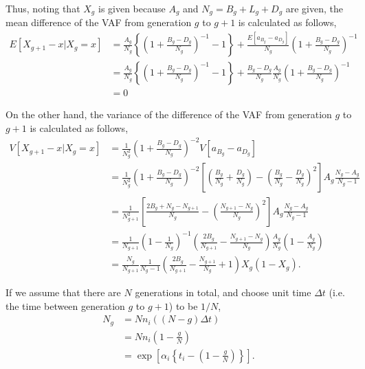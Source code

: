 \documentclass[12pt]{article}
\begin{document}
Thus, noting that $X_g$ is given because $A_g$ and $N_g = B_g + L_g + D_g$ are given, the mean difference of the VAF from generation $g$ to $g+1$ is calculated as follows,
\begin{align}
 E[X_{g+1} - x | X_{g}=x] & = \frac{A_g}{N_g} \left\{ \left(1 + \frac{B_g - D_g}{N_g}\right)^{-1} - 1 \right\} + \frac{ E\left[ a_{B_g} - a_{D_g} \right] }{N_g} \left( 1 + \frac{B_g - D_g}{N_g} \right)^{-1} \nonumber\label{VAF_diff_mean}\\
 & = \frac{A_g}{N_g} \left\{ \left(1 + \frac{B_g - D_g}{N_g}\right)^{-1} - 1 \right\} +  \frac{B_g - D_g}{N_g} \frac{A_g}{N_g} \left( 1 + \frac{B_g - D_g}{N_g} \right)^{-1} \nonumber\\
 & = 0
\end{align}

On the other hand, the variance of the difference of the VAF from generation $g$ to $g+1$ is calculated as follows,
\begin{align}
 V[X_{g+1} - x | X_{g}=x] & = \frac{1}{N_g^2} \left(1 + \frac{B_g - D_g}{N_g}\right)^{-2} V[a_{B_g} - a_{D_g}] \nonumber\\
 & = \frac{1}{N_g^2} \left(1 + \frac{B_g - D_g}{N_g}\right)^{-2} \left[ \left( \frac{B_g}{N_g} + \frac{D_g}{N_g} \right) - \left( \frac{B_g}{N_g} - \frac{D_g}{N_g} \right)^2 \right] A_g \frac{N_g - A_g}{N_g - 1} \nonumber\\
 & = \frac{1}{N_{g+1}^2} \left[ \frac{2B_g + N_g - N_{g+1}}{N_g} - \left( \frac{N_{g+1} - N_g}{N_g} \right)^2 \right] A_g \frac{N_g - A_g}{N_g - 1} \nonumber\\
 & = \frac{1}{N_{g+1}} \left(1 - \frac{1}{N_g}\right)^{-1} \left( \frac{2B_g}{N_{g+1}} - \frac{N_{g+1} - N_g}{N_g} \right) \frac{A_g}{N_g} \left(1 - \frac{A_g}{N_g} \right) \nonumber\\
 & = \frac{N_g}{N_{g+1}} \frac{1}{N_g - 1} \left( \frac{2B_g}{N_{g+1}} - \frac{N_{g+1}}{N_g} + 1 \right) X_g \left(1 - X_g \right).
\end{align}

If we assume that there are $N$ generations in total, and choose unit time $\varDelta t$ (i.e. the time between generation $g$ to $g+1$) to be $1/N$, 
\begin{align}
 N_g & = Nn_i ((N - g) \varDelta t)\nonumber \\
 & = Nn_i \left(1 - \frac{g}{N}\right)\nonumber \\
 & = \exp \left[\alpha_i \left\{ t_i - \left( 1 - \frac{g}{N} \right)\right\}\right].
\end{align}
\end{document}
